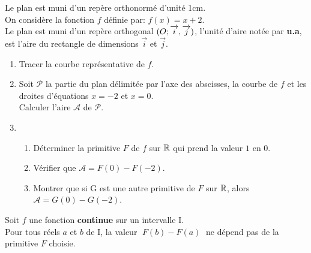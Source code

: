 \begin{lemma}
Le plan est  muni d'un repère orthonormé d'unité 1cm.\\
 On considère la fonction $f$ définie par: $f (x)=x+2 $.\\
Le plan est muni d'un repère orthogonal  $ (O ;\overrightarrow{i},\overrightarrow{j}) $, \; l'unité d'aire notée par \textbf{u.a},\;  est l'aire du rectangle de dimensions     $\overrightarrow{i}$  et  $\overrightarrow{j}$.
 \begin{enumerate}
 \item Tracer la courbe représentative de $f$.
 \item Soit $\mathscr{P}$ la partie du plan délimitée par l'axe des abscisses, la courbe de $f$ et les droites d'équations $ x=-2$ et $x=0 $.\\Calculer l'aire $\mathscr{A}$ de $\mathscr{P}$.
 \item 
 \begin{enumerate}
 \item Déterminer la primitive $F$ de $f$  sur  $ \mathbb{R} $ qui prend la valeur $1$ en $0$.
 \item Vérifier que $\mathscr{A}=F(0)- F (-2) $.
 \item Montrer que si G est une autre primitive de $F$ sur $  \mathbb{R} $,\; alors $\mathscr{A}=G(0)- G(-2) $.  
 \end{enumerate}
 \end{enumerate}
 
\end{lemma}
Soit $f$ une fonction \textbf{continue} sur un intervalle I.\\Pour tous réels $a$ et $b$   de I, la valeur  $\; F(b) -F(a)\; $ ne dépend pas de la primitive $F$ choisie.
